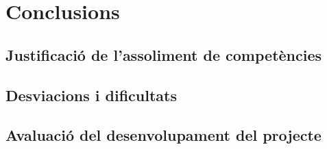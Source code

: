 
\chapter{Conclusions} %

\label{Conclusions} %

\section{Justificació de l'assoliment de competències}

\section{Desviacions i dificultats}

\section{Avaluació del desenvolupament del projecte}